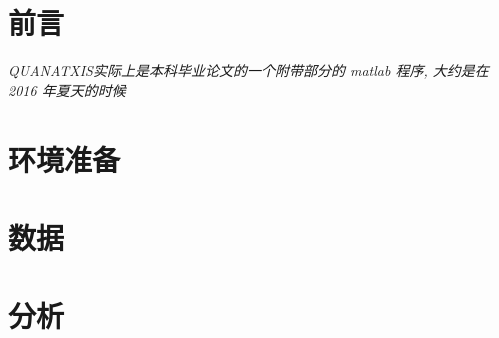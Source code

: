 \documentclass{scrartcl}
\numberwithin{equation}{section}
\begin{document}
\maketitle
\lhead{}
\chead{}
\cfoot{}
\rfoot{\thepage}

\setlength{\hoffset}{0mm}
\setlength{\voffset}{0mm}
\newpage
\renewcommand{\headrulewidth}{0.4pt}
\renewcommand{\footrulewidth}{0.4pt}
\setcounter{secnumdepth}{3}
\setcounter{tocdepth}{3}

\tableofcontents
\etocsettocstyle{\subsection*{\contentsname}}{}

\newpage
\section{前言}
\textsl{QUANATXIS实际上是本科毕业论文的一个附带部分的 matlab 程序, 大约是在 2016 年夏天的时候 }



\newpage
\section{环境准备}

\newpage
\section{数据}

\newpage
\section{分析}
\newpage
\section{}
\end{document}
